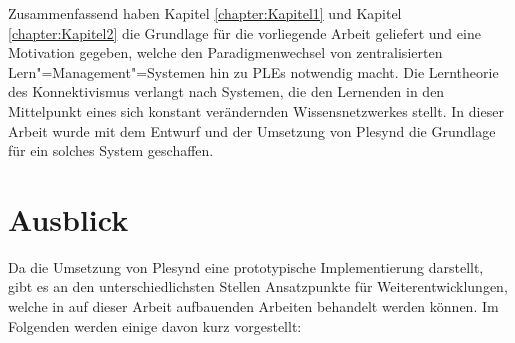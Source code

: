 Zusammenfassend haben Kapitel \ref{chapter:Kapitel1} und Kapitel \ref{chapter:Kapitel2} die Grundlage für die vorliegende Arbeit geliefert und eine Motivation gegeben, welche den Paradigmenwechsel von zentralisierten Lern"=Management"=Systemen hin zu \acp{PLE} notwendig macht. Die Lerntheorie des Konnektivismus verlangt nach Systemen, die den Lernenden in den Mittelpunkt eines sich konstant verändernden Wissensnetzwerkes stellt. In dieser Arbeit wurde mit dem Entwurf und der Umsetzung von Plesynd die Grundlage für ein solches System geschaffen.

\section{Ausblick}
Da die Umsetzung von Plesynd eine prototypische Implementierung darstellt, gibt es an den unterschiedlichsten Stellen Ansatzpunkte für Weiterentwicklungen, welche in auf dieser Arbeit aufbauenden Arbeiten behandelt werden können. Im Folgenden werden einige davon kurz vorgestellt:

